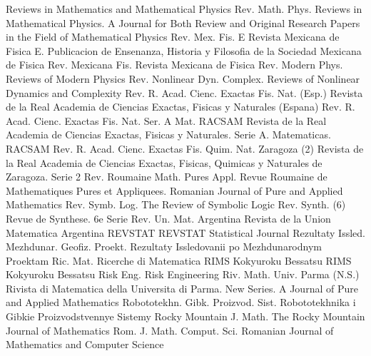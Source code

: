 {Reviews in Mathematics and Mathematical Physics}
{Rev. Math. Phys.}
{Reviews in Mathematical Physics. A Journal for Both Review and Original Research Papers in the Field of Mathematical Physics}
{Rev. Mex. Fis. E}
{Revista Mexicana de Fisica E. Publicacion de Ensenanza, Historia y Filosofia de la Sociedad Mexicana de Fisica}
{Rev. Mexicana Fis.}
{Revista Mexicana de Fisica}
{Rev. Modern Phys.}
{Reviews of Modern Physics}
{Rev. Nonlinear Dyn. Complex.}
{Reviews of Nonlinear Dynamics and Complexity}
{Rev. R. Acad. Cienc. Exactas Fis. Nat. (Esp.)}
{Revista de la Real Academia de Ciencias Exactas, Fisicas y Naturales (Espana)}
{Rev. R. Acad. Cienc. Exactas Fis. Nat. Ser. A Mat. RACSAM}
{Revista de la Real Academia de Ciencias Exactas, Fisicas y Naturales. Serie A. Matematicas. RACSAM}
{Rev. R. Acad. Cienc. Exactas Fis. Quim. Nat. Zaragoza (2)}
{Revista de la Real Academia de Ciencias Exactas, Fisicas, Quimicas y Naturales de Zaragoza. Serie 2}
{Rev. Roumaine Math. Pures Appl.}
{Revue Roumaine de Mathematiques Pures et Appliquees. Romanian Journal of Pure and Applied Mathematics}
{Rev. Symb. Log.}
{The Review of Symbolic Logic}
{Rev. Synth. (6)}
{Revue de Synthese. 6e Serie}
{Rev. Un. Mat. Argentina}
{Revista de la Union Matematica Argentina}
{REVSTAT}
{REVSTAT Statistical Journal}
{Rezultaty Issled. Mezhdunar. Geofiz. Proekt.}
{Rezultaty Issledovanii po Mezhdunarodnym Proektam}
{Ric. Mat.}
{Ricerche di Matematica}
{RIMS Kokyuroku Bessatsu}
{RIMS Kokyuroku Bessatsu}
{Risk Eng.}
{Risk Engineering}
{Riv. Math. Univ. Parma (N.S.)}
{Rivista di Matematica della Universita di Parma. New Series. A Journal of Pure and Applied Mathematics}
{Robototekhn. Gibk. Proizvod. Sist.}
{Robototekhnika i Gibkie Proizvodstvennye Sistemy}
{Rocky Mountain J. Math.}
{The Rocky Mountain Journal of Mathematics}
{Rom. J. Math. Comput. Sci.}
{Romanian Journal of Mathematics and Computer Science}
